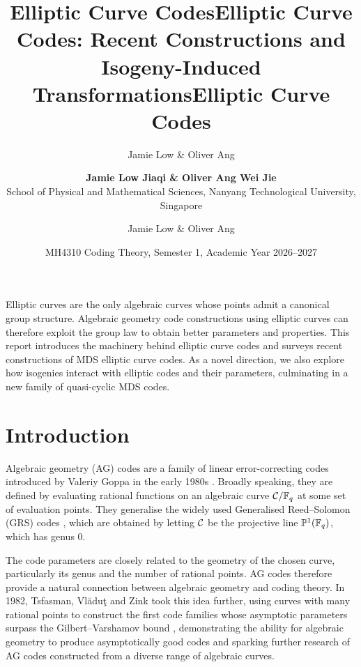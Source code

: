 \documentclass[twocolumn, 11pt]{scrartcl}
\title{Elliptic Curve Codes}
\author{Jamie Low \& Oliver Ang}
\begin{document}
\title{\textbf{Elliptic Curve Codes: Recent Constructions and Isogeny-Induced Transformations}}
\author{\textbf{Jamie Low Jiaqi \& Oliver Ang Wei Jie}\\School of Physical and Mathematical Sciences, Nanyang Technological University, Singapore}
\date{MH4310 Coding Theory, Semester 1, Academic Year 2026--2027}
\maketitle

\title{Elliptic Curve Codes}
\author{Jamie Low \& Oliver Ang}
\date{}


Elliptic curves are the only algebraic curves whose points admit a canonical group structure. Algebraic geometry code constructions using elliptic curves can therefore exploit the group law to obtain better parameters and properties. This report introduces the machinery behind elliptic curve codes and surveys recent constructions of MDS elliptic curve codes. As a novel direction, we also explore how isogenies interact with elliptic codes and their parameters, culminating in a new family of quasi-cyclic MDS codes.

\section{Introduction} \label{section:introduction}

Algebraic geometry (AG) codes are a family of linear error-correcting codes introduced by Valeriy Goppa in the early 1980s \cite{goppa1983algebraico}. Broadly speaking, they are defined by evaluating rational functions on an algebraic curve $\mathcal{C}/\mathbb{F}_q$ at some set of evaluation points. They generalise the widely used Generalised Reed--Solomon (GRS) codes \cite{macwilliams1977theory}, which are obtained by letting $\mathcal{C}$ be the projective line $\mathbb{P}^1(\mathbb{F}_q)$, which has genus 0.

The code parameters are closely related to the geometry of the chosen curve, particularly its genus and the number of rational points. AG codes therefore provide a natural connection between algebraic geometry and coding theory. In 1982, Tsfasman, Vl\u{a}du\c{t} and Zink took this idea further, using curves with many rational points to construct the first code families whose asymptotic parameters surpass the Gilbert--Varshamov bound \cite{tsfasman1982modular}, demonstrating the ability for algebraic geometry to produce asymptotically good codes and sparking further research of AG codes constructed from a diverse range of algebraic curves.
\end{document}
